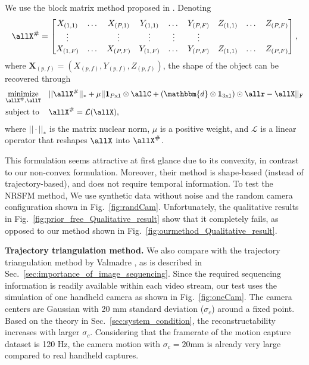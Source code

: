 We use the block matrix method proposed in \cite{dai2014simple}. Denoting
\begin{equation}
\allX^\# = 
\begin{bmatrix}
X_{(1,1)}& \dots& X_{(P,1)} & Y_{(1,1)}& \dots& Y_{(P,F)} & Z_{(1,1)}& \dots& Z_{(P,F)} \\
\vdots   &  				& \vdots   & \vdots 		  & \vdots   & \vdots			  \\
X_{(1,F)}& \dots& X_{(P,F)} & Y_{(1,F)}& \dots& Y_{(P,F)} & Z_{(1,1)}& \dots& Z_{(P,F)}\nonumber		  
\end{bmatrix},
\end{equation}
where $\mathbf{X}_{(p,f)} = (X_{(p,f)},Y_{(p,f)},Z_{(p,f)})$, the shape of the object can be recovered through 
\begin{equation}
\begin{aligned}
& \underset{\allX^\#, \allT}{\text{minimize}} &&
||\allX^\#||_* + \mu ||\mathbf{1}_{P\text{x}1} \otimes \allC + (\mathbbm{d} \otimes \mathbf{1}_{3\text{x}1}) \odot \allr - \allX||_{\text{F}}\\
&\text{subject to} && \allX^\# = \mathcal{L}(\allX), \nonumber
\end{aligned}
\end{equation}
where $||\cdot||_*$ is the matrix nuclear norm, $\mu$ is a positive weight, and $\mathcal{L}$ is a linear operator that reshapes $\allX$ into $\allX^\#$. 

This formulation seems attractive at first glance due to its convexity, in contrast to our non-convex formulation. Moreover, their method is shape-based (instead of trajectory-based), and does not require temporal information. 
To test the NRSFM method, We use synthetic data without noise and the random camera configuration shown in Fig.~\ref{fig:randCam}.
Unfortunately, the qualitative results in Fig.~\ref{fig:prior_free_Qualitative_result} show that it completely fails, as opposed to our method shown in Fig.~\ref{fig:ourmethod_Qualitative_result}. 


\textbf{Trajectory triangulation method.} We also compare with the trajectory triangulation method by Valmadre \etal \cite{Valmadre_CVPR2012}, as is described in Sec.~\ref{sec:importance_of_image_sequencing}. 
Since the required sequencing information is readily available within each video stream, our test uses the simulation of one handheld camera as shown in Fig.~\ref{fig:oneCam}. The camera centers are Gaussian with 20 mm standard deviation ($\sigma_c$) around a fixed point. %
Based on the theory in Sec.~\ref{sec:system_condition}, the reconstructability increases with larger $\sigma_c$.
Considering that the framerate of the motion capture dataset is 120 Hz, the camera motion with  $\sigma_c = 20$mm is already very large compared to real handheld captures.

